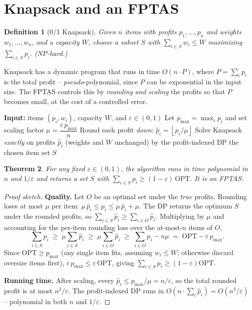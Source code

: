 \documentclass[11pt]{article}
\newtheorem{theorem}{Theorem}[section]
\newtheorem{definition}[theorem]{Definition}
\begin{document}
\section{Knapsack and an FPTAS}

\begin{definition}[0/1 Knapsack]
Given $n$ items with profits $p_1, \ldots, p_n$ and weights $w_1, \ldots, w_n$, and a
capacity $W$, choose a subset $S$ with $\sum_{i \in S} w_i \le W$ maximizing $\sum_{i \in
S} p_i$. (NP-hard.)
\end{definition}

Knapsack has a dynamic program that runs in time $O(n \cdot P)$, where $P = \sum_i p_i$ is
the total profit -- \emph{pseudo}-polynomial, since $P$ can be exponential in the input
size. The FPTAS controls this by \emph{rounding and scaling} the profits so that $P$
becomes small, at the cost of a controlled error.

\begin{algorithm}[h]
\caption{Knapsack FPTAS (Problem 9)}
\begin{algorithmic}[1]
\State \textbf{Input:} items $(p_i, w_i)$, capacity $W$, and $\varepsilon \in (0, 1)$
\State Let $p_{\max} = \max_i p_i$ and set scaling factor $\mu = \dfrac{\varepsilon\, p_{\max}}{n}$
\State Round each profit \emph{down}: $\hat p_i = \left\lfloor p_i / \mu \right\rfloor$
\State Solve Knapsack \emph{exactly} on profits $\hat p_i$ (weights and $W$ unchanged) by the profit-indexed DP
\State \Return the chosen item set $S$
\end{algorithmic}
\end{algorithm}

\begin{theorem}
\label{thm:fptas}
For any fixed $\varepsilon \in (0,1)$, the algorithm runs in time polynomial in $n$ and
$1/\varepsilon$ and returns a set $S$ with $\sum_{i \in S} p_i \ge (1 - \varepsilon)\,
\mathrm{OPT}$. It is an FPTAS.
\end{theorem}

\begin{proof}[Proof sketch]
\textbf{Quality.} Let $O$ be an optimal set under the \emph{true} profits. Rounding loses
at most $\mu$ per item: $\mu\,\hat p_i \le p_i \le \mu\,\hat p_i + \mu$. The DP returns the
optimum $S$ under the rounded profits, so $\sum_{i \in S}\hat p_i \ge \sum_{i \in O}\hat
p_i$. Multiplying by $\mu$ and accounting for the per-item rounding loss over the at-most-$n$
items of $O$,
\[
    \sum_{i \in S} p_i \;\ge\; \mu \sum_{i \in S}\hat p_i \;\ge\; \mu \sum_{i \in O}\hat
    p_i \;\ge\; \sum_{i \in O} p_i - n\mu \;=\; \mathrm{OPT} - \varepsilon\, p_{\max}.
\]
Since $\mathrm{OPT} \ge p_{\max}$ (any single item fits, assuming $w_i \le W$; otherwise
discard oversize items first), $\varepsilon\, p_{\max} \le \varepsilon\,\mathrm{OPT}$,
giving $\sum_{i\in S} p_i \ge (1 - \varepsilon)\mathrm{OPT}$.

\textbf{Running time.} After scaling, every $\hat p_i \le p_{\max}/\mu = n/\varepsilon$, so
the total rounded profit is at most $n^2/\varepsilon$. The profit-indexed DP runs in
$O(n \cdot \sum_i \hat p_i) = O(n^3/\varepsilon)$ -- polynomial in both $n$ and
$1/\varepsilon$.
\end{proof}
\end{document}
